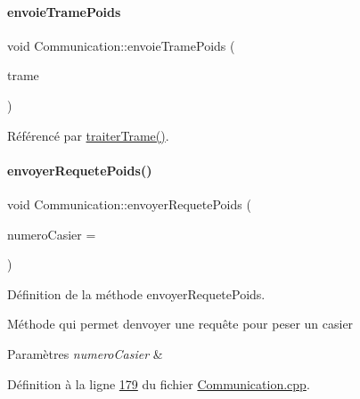 \mbox{\label{class_communication_aaea5653e8aa1b50b4774caf65db21409}} 
\paragraph{\texorpdfstring{envoie\+Trame\+Poids}{envoieTramePoids}}
{\footnotesize\ttfamily void Communication\+::envoie\+Trame\+Poids (\begin{DoxyParamCaption}\item[{Q\+String}]{trame }\end{DoxyParamCaption})\hspace{0.3cm}{\ttfamily [signal]}}



Référencé par \hyperlink{_communication_8cpp_source_l00158}{traiter\+Trame()}.

\mbox{\label{class_communication_ab8f5efe1d44805be0081e986b2687a12}} 
\paragraph{\texorpdfstring{envoyer\+Requete\+Poids()}{envoyerRequetePoids()}}
{\footnotesize\ttfamily void Communication\+::envoyer\+Requete\+Poids (\begin{DoxyParamCaption}\item[{Q\+String}]{numero\+Casier = {} }\end{DoxyParamCaption})}



Définition de la méthode envoyer\+Requete\+Poids. 

Méthode qui permet d\textquotesingle{}envoyer une requête pour peser un casier 
\begin{DoxyParams}{Paramètres}
{\em numero\+Casier} & \\
\hline
\end{DoxyParams}


Définition à la ligne \hyperlink{_communication_8cpp_source_l00179}{179} du fichier \hyperlink{_communication_8cpp_source}{Communication.\+cpp}.



